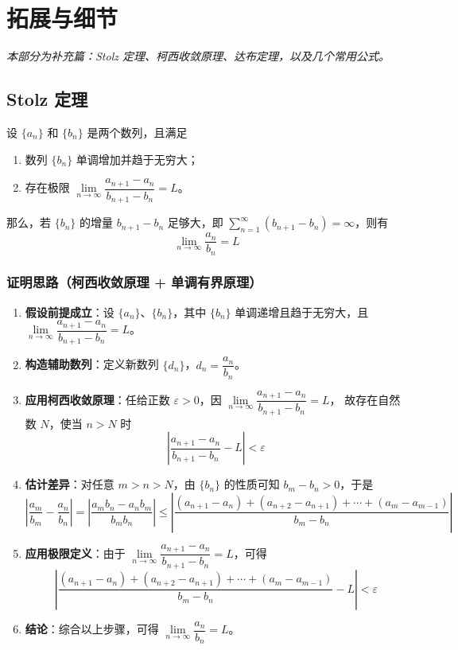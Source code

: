 
\section{拓展与细节}
\noindent\textit{本部分为补充篇：Stolz 定理、柯西收敛原理、达布定理，以及几个常用公式。}

\subsection{Stolz 定理}
设 $\{a_n\}$ 和 $\{b_n\}$ 是两个数列，且满足
\begin{enumerate}
    \item 数列 $\{b_n\}$ 单调增加并趋于无穷大；
    \item 存在极限 $\lim\limits_{n\to\infty}\dfrac{a_{n+1}-a_n}{b_{n+1}-b_n}=L$。
\end{enumerate}
那么，若 $\{b_n\}$ 的增量 $b_{n+1}-b_n$ 足够大，即 $\sum\limits_{n=1}^{\infty}(b_{n+1}-b_n)=\infty$，则有
\[
\lim_{n\to\infty}\frac{a_n}{b_n}=L
\]

\subsubsection{证明思路（柯西收敛原理 + 单调有界原理）}
\begin{enumerate}
    \item \textbf{假设前提成立}：设 $\{a_n\}$、$\{b_n\}$，其中 $\{b_n\}$ 单调递增且趋于无穷大，且
          $\lim\limits_{n\to\infty}\dfrac{a_{n+1}-a_n}{b_{n+1}-b_n}=L$。
    \item \textbf{构造辅助数列}：定义新数列 $\{d_n\}$，$d_n=\dfrac{a_n}{b_n}$。
    \item \textbf{应用柯西收敛原理}：任给正数 $\varepsilon>0$，因 $\lim\limits_{n\to\infty}\dfrac{a_{n+1}-a_n}{b_{n+1}-b_n}=L$，
          故存在自然数 $N$，使当 $n>N$ 时
          \[
          \left|\frac{a_{n+1}-a_n}{b_{n+1}-b_n}-L\right|<\varepsilon
          \]
    \item \textbf{估计差异}：对任意 $m>n>N$，由 $\{b_n\}$ 的性质可知 $b_m-b_n>0$，于是
          \[
          \left|\frac{a_m}{b_m}-\frac{a_n}{b_n}\right|
          =\left|\frac{a_m b_n-a_n b_m}{b_m b_n}\right|
          \le\left|\frac{(a_{n+1}-a_n)+(a_{n+2}-a_{n+1})+\cdots+(a_m-a_{m-1})}{b_m-b_n}\right|
          \]
    \item \textbf{应用极限定义}：由于 $\lim\limits_{n\to\infty}\dfrac{a_{n+1}-a_n}{b_{n+1}-b_n}=L$，可得
          \[
          \left|\frac{(a_{n+1}-a_n)+(a_{n+2}-a_{n+1})+\cdots+(a_m-a_{m-1})}{b_m-b_n}-L\right|<\varepsilon
          \]
    \item \textbf{结论}：综合以上步骤，可得 $\lim\limits_{n\to\infty}\dfrac{a_n}{b_n}=L$。
\end{enumerate}

